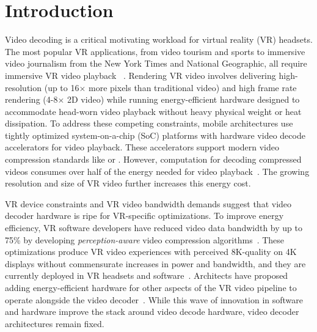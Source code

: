\section{Introduction}

Video decoding is a critical motivating workload for virtual reality (VR) headsets.
The most popular VR applications, from \threesixty video tourism and sports to immersive video journalism from the New York Times and National Geographic, all require immersive VR video playback ~\cite{nytvr,nationalgeographic-vr}.
Rendering VR video involves delivering high-resolution (up to 16$\times$ more pixels than traditional video) and high frame rate rendering (4-8$\times$ 2D video) while running energy-efficient hardware designed to accommodate head-worn video playback without heavy physical weight or heat dissipation.
To address these competing constraints, mobile architectures use tightly optimized system-on-a-chip (SoC) platforms with hardware video decode accelerators for video playback.
These accelerators support modern video compression standards like \hevc or \vpnine.
However, computation for decoding compressed videos consumes over half of the energy needed for video playback~\cite{google2018asplos,hevcThesis}.
The growing resolution and size of VR video further increases this energy cost.

\foveatedExampleFigure

VR device constraints and VR video bandwidth demands suggest that video decoder hardware is ripe for VR-specific optimizations.
To improve energy efficiency, VR software developers have reduced video data bandwidth by up to 75\% by developing \emph{perception-aware} video compression algorithms~\cite{guenter2012foveated,patney2017perceptual, visualcloud2017haynes,rubiks,fov-cloud-ryoo}.
These optimizations produce VR video experiences with perceived 8K-quality on 4K displays without commensurate increases in power and bandwidth, and they are currently deployed in VR headsets and software~\cite{htc-vive-pro-eye, patney2017perceptual, kaplanyan2019deepfovea}.
Architects have proposed adding energy-efficient hardware for other aspects of the VR video pipeline to operate alongside the video decoder~\cite{evr19isca, leng2018semantic, xie2018perception, zhang2017race}.
While this wave of innovation in software and hardware improve the stack around video decode hardware, video decoder architectures remain fixed.


